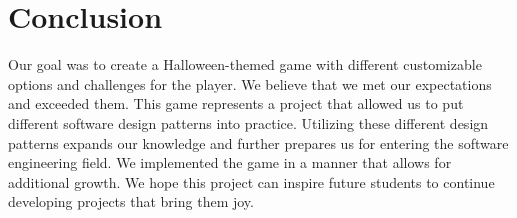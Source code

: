 \documentclass[sigplan,screen]{acmart}
\begin{document}
\section{Conclusion}
Our goal was to create a Halloween-themed game with different customizable options and challenges for the player. We believe that we met our expectations and exceeded them. This game represents a project that allowed us to put different software design patterns into practice. Utilizing these different design patterns expands our knowledge and further prepares us for entering the software engineering field. We implemented the game in a manner that allows for additional growth. We hope this project can inspire future students to continue developing projects that bring them joy.\cite{code} 



\end{document}

